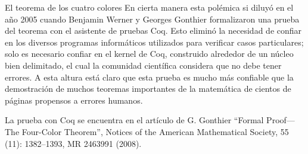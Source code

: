 \begin{section}{El teorema de los cuatro colores}
En  cierta manera esta polémica si diluyó en el año 2005 cuando Benjamin Werner y Georges Gonthier formalizaron una prueba del teorema con el asistente de pruebas Coq. Esto eliminó la necesidad de confiar en los diversos programas informáticos utilizados para verificar casos particulares; solo es necesario confiar en el kernel de Coq, construido alrededor de un núcleo bien delimitado, el cual la comunidad científica considera que no debe tener errores. A esta altura está claro que esta prueba es mucho más confiable que la demostración de muchos teoremas importantes de la matemática de cientos de páginas propensos a errores humanos.

La prueba con Coq se encuentra en el artículo de G. Gonthier ``Formal Proof—The Four-Color Theorem'', Notices of the American Mathematical Society, 55 (11): 1382–1393, MR 2463991 (2008).  

\end{section}
